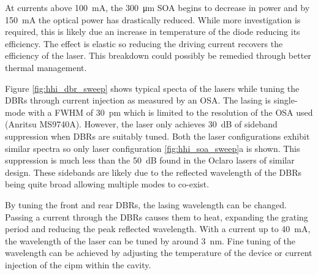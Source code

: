 At currents above \SI{100}{\mA}, the \SI{300}{\um} \ac{SOA} begins to decrease in power and by \SI{150}{\mA} the optical power has drastically reduced. While more investigation is required, this is likely due an increase in temperature of the diode reducing its efficiency. The effect is elastic so reducing the driving current recovers the efficiency of the laser. This breakdown could possibly be remedied through better thermal management.


Figure \ref{fig:hhi_dbr_sweep} shows typical specta of the lasers while tuning the \acp{DBR} through current injection as measured by an \ac{OSA}. The lasing is single-mode with a \ac{FWHM} of \SI{30}{pm} which is limited to the resolution of the \ac{OSA} used (Anritsu MS9740A). However, the laser only achieves \SI{30}{dB} of sideband suppression when \acp{DBR} are suitably tuned. Both the laser configurations exhibit similar spectra so only laser configuration \ref{fig:hhi_soa_sweep}a is shown. This suppression is much less than the \SI{50}{dB} found in the Oclaro lasers of similar design. These sidebands are likely due to the reflected wavelength of the \acp{DBR} being quite broad allowing multiple modes to co-exist. 

By tuning the front and rear \acp{DBR}, the lasing wavelength can be changed. Passing a current through the \acp{DBR} causes them to heat, expanding the grating period and reducing the peak reflected wavelength. With a current up to \SI{40}{\mA}, the wavelength of the laser can be tuned by around \SI{3}{nm}. Fine tuning of the wavelength can be achieved by adjusting the temperature of the device or current injection of the \ac{cipm} within the cavity. 



